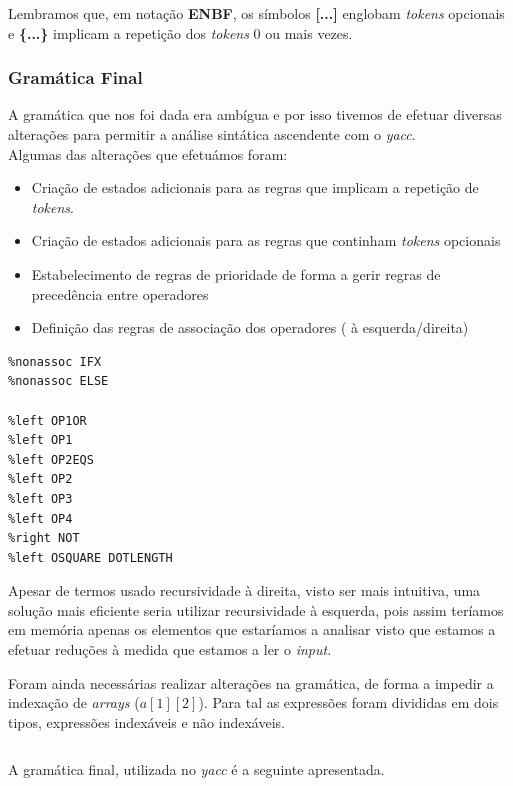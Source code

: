 \documentclass[12pt]{article}
\begin{document}
\vspace{0.5cm}

Lembramos que, em notação \textbf{ENBF}, os símbolos \textbf{[...]} englobam \emph{tokens} opcionais e \textbf{\{...\}} implicam a repetição dos \emph{tokens} 0 ou mais vezes.


\pagebreak
\subsubsection{Gramática Final}
\par A gramática que nos foi dada era ambígua e por isso tivemos de efetuar diversas alterações para permitir a análise sintática ascendente com o \emph{yacc}.\\
Algumas das alterações que efetuámos foram:
\begin{itemize}
	\item Criação de estados adicionais para as regras que implicam a repetição de \emph{tokens}.
	\item Criação de estados adicionais para as regras que continham \emph{tokens} opcionais
	\item Estabelecimento de regras de prioridade de forma a gerir regras de precedência entre operadores
	\item Definição das regras de associação dos operadores ( à esquerda/direita)
\end{itemize}

\lstset{language=c,caption=Associação de Operadores,label=Estruturas2}
\begin{lstlisting}
%nonassoc IFX
%nonassoc ELSE

%left OP1OR
%left OP1
%left OP2EQS
%left OP2
%left OP3
%left OP4
%right NOT
%left OSQUARE DOTLENGTH
\end{lstlisting}  


Apesar de termos usado recursividade  à direita, visto ser mais intuitiva, uma solução mais eficiente seria utilizar recursividade à esquerda, pois assim teríamos em memória apenas os elementos que estaríamos a analisar visto que estamos a efetuar reduções à medida que estamos a ler o \emph{input}.
\par Foram ainda necessárias realizar alterações na gramática, de forma a impedir a indexação de \emph{arrays} ($a[1][2]$). Para tal as expressões foram divididas em dois tipos, expressões indexáveis e não indexáveis.

$$$$

A gramática final, utilizada no \emph{yacc} é a seguinte apresentada.
\end{document}
